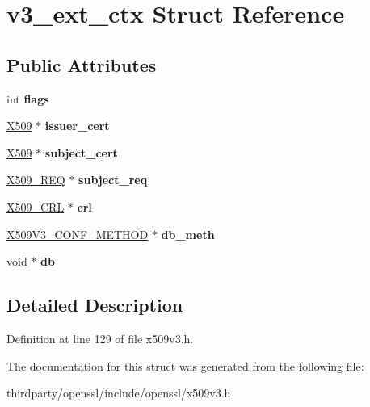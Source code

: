 \hypertarget{structv3__ext__ctx}{}\section{v3\+\_\+ext\+\_\+ctx Struct Reference}
\label{structv3__ext__ctx}
\subsection*{Public Attributes}
\begin{DoxyCompactItemize}
\item 
\mbox{\label{structv3__ext__ctx_aef13996482523a866443b3160db73291}} 
int {\bfseries flags}
\item 
\mbox{\label{structv3__ext__ctx_a727f0302b59312053fdcbd09a195cf85}} 
\hyperlink{structx509__st}{X509} $\ast$ {\bfseries issuer\+\_\+cert}
\item 
\mbox{\label{structv3__ext__ctx_ab93937a6f72e09c41303ebe54c6aa6be}} 
\hyperlink{structx509__st}{X509} $\ast$ {\bfseries subject\+\_\+cert}
\item 
\mbox{\label{structv3__ext__ctx_a2c538c77545078ac3834d7ec19baa2e1}} 
\hyperlink{struct_x509__req__st}{X509\+\_\+\+R\+EQ} $\ast$ {\bfseries subject\+\_\+req}
\item 
\mbox{\label{structv3__ext__ctx_a01c6e9a776b48effe171dccb3f5ba653}} 
\hyperlink{struct_x509__crl__st}{X509\+\_\+\+C\+RL} $\ast$ {\bfseries crl}
\item 
\mbox{\label{structv3__ext__ctx_a7e8b728812e1ae2216de8991faeae558}} 
\hyperlink{struct_x509_v3___c_o_n_f___m_e_t_h_o_d__st}{X509\+V3\+\_\+\+C\+O\+N\+F\+\_\+\+M\+E\+T\+H\+OD} $\ast$ {\bfseries db\+\_\+meth}
\item 
\mbox{\label{structv3__ext__ctx_ab9c02945f7b4566735f6184baf63b765}} 
void $\ast$ {\bfseries db}
\end{DoxyCompactItemize}


\subsection{Detailed Description}


Definition at line 129 of file x509v3.\+h.



The documentation for this struct was generated from the following file\+:\begin{DoxyCompactItemize}
\item 
thirdparty/openssl/include/openssl/x509v3.\+h\end{DoxyCompactItemize}
